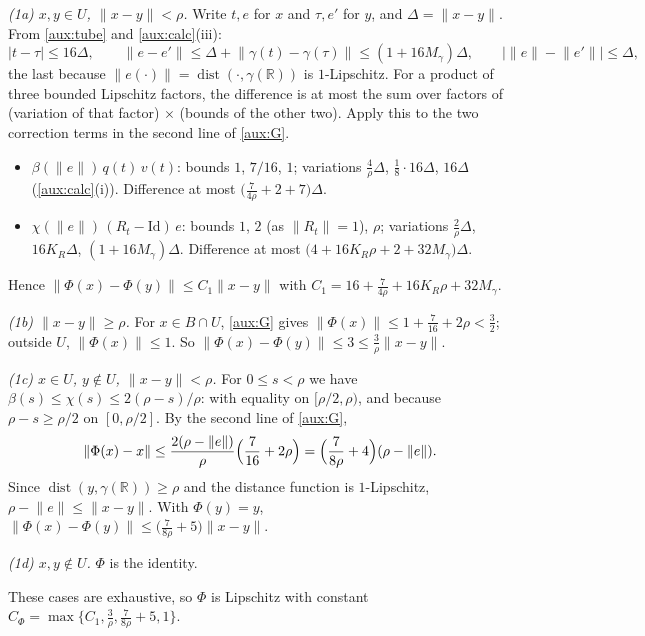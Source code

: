 \documentclass[11pt]{article}
\newcommand{\R}{\mathbb R}
\newcommand{\norm}[1]{\lVert #1\rVert}
\DeclareMathOperator{\dist}{dist}
\theoremstyle{definition}
\numberwithin{equation}{section}
\begin{document}
\emph{(1a) \(x,y\in U\), \(\norm{x-y}<\rho\).} Write \(t,e\) for \(x\) and
\(\tau,e'\) for \(y\), and \(\Delta=\norm{x-y}\). From \cref{aux:tube} and
\cref{aux:calc}(iii):
\[
 |t-\tau|\le16\Delta,\qquad
 \norm{e-e'}\le\Delta+\norm{\gamma(t)-\gamma(\tau)}\le(1+16M_\gamma)\Delta,
 \qquad\bigl|\norm e-\norm{e'}\bigr|\le\Delta,
\]
the last because \(\norm{e(\cdot)}=\dist(\cdot,\gamma(\R))\) is
\(1\)-Lipschitz. For a product of three bounded Lipschitz factors, the
difference is at most the sum over factors of (variation of that factor)
\(\times\) (bounds of the other two). Apply this to the two correction terms
in the second line of \eqref{aux:G}.
\begin{itemize}
\item \(\beta(\norm e)\,q(t)\,v(t)\): bounds \(1\), \(7/16\), \(1\);
variations \(\frac4\rho\Delta\), \(\frac18\cdot16\Delta\), \(16\Delta\)
(\cref{aux:calc}(i)). Difference at most
\(\bigl(\frac{7}{4\rho}+2+7\bigr)\Delta\).
\item \(\chi(\norm e)\,(R_t-\mathrm{Id})\,e\): bounds \(1\), \(2\) (as
\(\norm{R_t}=1\)), \(\rho\); variations \(\frac2\rho\Delta\),
\(16K_R\Delta\), \((1+16M_\gamma)\Delta\). Difference at most
\(\bigl(4+16K_R\rho+2+32M_\gamma\bigr)\Delta\).
\end{itemize}
Hence \(\norm{\Phi(x)-\Phi(y)}\le C_1\norm{x-y}\) with
\(C_1=16+\frac7{4\rho}+16K_R\rho+32M_\gamma\).

\emph{(1b) \(\norm{x-y}\ge\rho\).} For \(x\in B\cap U\), \eqref{aux:G} gives
\(\norm{\Phi(x)}\le1+\frac7{16}+2\rho<\frac32\); outside \(U\),
\(\norm{\Phi(x)}\le1\). So
\(\norm{\Phi(x)-\Phi(y)}\le3\le\frac3\rho\norm{x-y}\).

\emph{(1c) \(x\in U\), \(y\notin U\), \(\norm{x-y}<\rho\).} For
\(0\le s<\rho\) we have \(\beta(s)\le\chi(s)\le2(\rho-s)/\rho\): with equality
on \([\rho/2,\rho)\), and because \(\rho-s\ge\rho/2\) on \([0,\rho/2]\). By
the second line of \eqref{aux:G},
\[
 \norm{\Phi(x)-x}\le\frac{2(\rho-\norm e)}{\rho}\Bigl(\frac7{16}+2\rho\Bigr)
 =\Bigl(\frac{7}{8\rho}+4\Bigr)(\rho-\norm e).
\]
Since \(\dist(y,\gamma(\R))\ge\rho\) and the distance function is
\(1\)-Lipschitz, \(\rho-\norm e\le\norm{x-y}\). With \(\Phi(y)=y\),
\(\norm{\Phi(x)-\Phi(y)}\le\bigl(\frac7{8\rho}+5\bigr)\norm{x-y}\).

\emph{(1d) \(x,y\notin U\).} \(\Phi\) is the identity.

These cases are exhaustive, so \(\Phi\) is Lipschitz with constant
\(C_\Phi=\max\{C_1,\frac3\rho,\frac7{8\rho}+5,1\}\).
\end{document}

